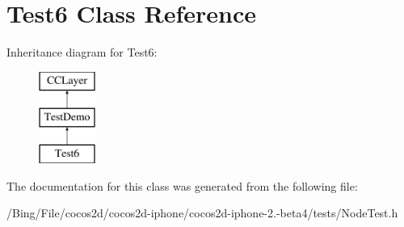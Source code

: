 \hypertarget{interface_test6}{\section{Test6 Class Reference}
\label{interface_test6}
}
Inheritance diagram for Test6\-:\begin{figure}[H]
\begin{center}
\leavevmode
\includegraphics[height=3.000000cm]{interface_test6}
\end{center}
\end{figure}


The documentation for this class was generated from the following file\-:\begin{DoxyCompactItemize}
\item 
/\-Bing/\-File/cocos2d/cocos2d-\/iphone/cocos2d-\/iphone-\/2.-\/beta4/tests/Node\-Test.\-h\end{DoxyCompactItemize}
